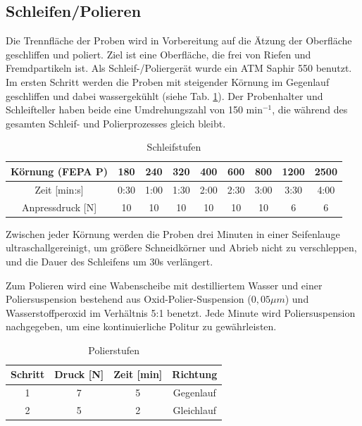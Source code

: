\subsection{Schleifen/Polieren}

Die Trennfläche der Proben wird in Vorbereitung auf die Ätzung der Oberfläche geschliffen und poliert. Ziel ist eine Oberfläche, die frei von Riefen und Fremdpartikeln ist. Als Schleif-/Poliergerät wurde ein ATM Saphir 550 benutzt.
Im ersten Schritt werden die Proben mit steigender Körnung im Gegenlauf geschliffen und dabei wassergekühlt (siehe Tab. \ref{tab:Schleifstufen}). Der Probenhalter und Schleifteller haben beide eine Umdrehungszahl von 150 min$^{-1}$, die während des gesamten Schleif- und Polierprozesses gleich bleibt.   

\begin{table}[]
	\centering
	\begin{tabular}{|c|c|c|c|c|c|c|c|c|}
		
		\hline 
		Körnung (FEPA P) & 180 & 240 & 320 & 400 & 600 & 800 & 1200 & 2500 \\ 
		\hline 
		Zeit [min:s] & 0:30 & 1:00 & 1:30 & 2:00 & 2:30 & 3:00 & 3:30 & 4:00 \\ 
		\hline 
		Anpressdruck [N] & 10&10&10&10&10&10&6&6\\
		\hline
	\end{tabular} 
	\caption{Schleifstufen}
	\label{tab:Schleifstufen}
\end{table}

Zwischen jeder Körnung werden die Proben drei Minuten in einer Seifenlauge ultraschallgereinigt, um größere Schneidkörner und Abrieb nicht zu verschleppen, und die Dauer des Schleifens um 30s verlängert. 

Zum Polieren wird eine Wabenscheibe mit destilliertem Wasser und einer Poliersuspension bestehend aus Oxid-Polier-Suspension ($0,05 \mu m$) und Wasserstoffperoxid im Verhältnis 5:1 benetzt. Jede Minute wird Poliersuspension nachgegeben, um eine kontinuierliche Politur zu gewährleisten.

\begin{table}[h]
	\centering
	
	\begin{tabular}{|c|c|c|c|}
		\hline 
		Schritt & Druck [N] & Zeit [min] & Richtung \\ 
		\hline 
		1 & 7 & 5 & Gegenlauf \\ 
		\hline 
		2 & 5 & 2 & Gleichlauf \\ 
		\hline 
	\end{tabular} 
	\caption{Polierstufen}
	\label{tab:Polierstufen}
\end{table}

